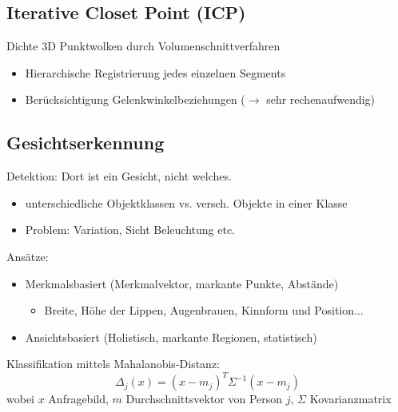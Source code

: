 \subsection{Iterative Closet Point (ICP)}
Dichte 3D Punktwolken durch Volumenschnittverfahren

\begin{itemize}
	\item Hierarchische Registrierung jedes einzelnen Segments
	\item Berücksichtigung Gelenkwinkelbeziehungen ($\to$ sehr rechenaufwendig)
\end{itemize}

\subsection{Gesichtserkennung}
Detektion: Dort ist ein Gesicht, nicht welches.

\begin{itemize}
	\item unterschiedliche Objektklassen vs. versch. Objekte in einer Klasse
	\item Problem: Variation, Sicht Beleuchtung etc.
\end{itemize}

Ansätze:
\begin{itemize}
	\item Merkmalsbasiert (Merkmalvektor, markante Punkte, Abstände)
	\begin{itemize}
		\item Breite, Höhe der Lippen, Augenbrauen, Kinnform und Position...
	\end{itemize}
	\item Ansichtsbasiert (Holistisch, markante Regionen, statistisch)
\end{itemize}

Klassifikation mittels Mahalanobis-Distanz:
$$\Delta_j(x) = (x - m_j)^T \Sigma^{-1}(x - m_j)$$
wobei $x$ Anfragebild, $m$ Durchschnittsvektor von Person $j$, $\Sigma$ Kovarianzmatrix











